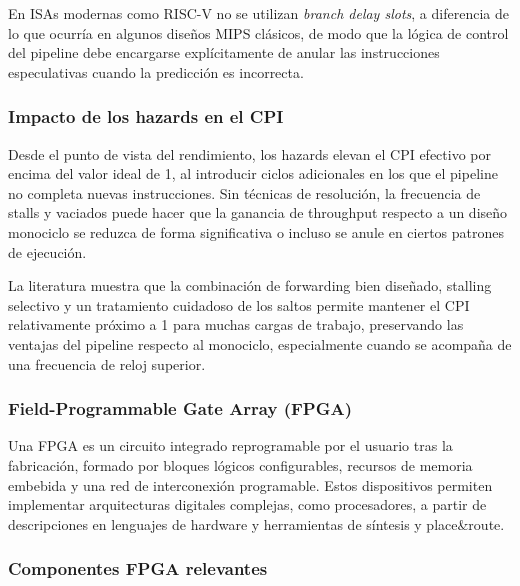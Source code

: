 En ISAs modernas como RISC-V no se utilizan \emph{branch delay slots}, a diferencia de lo que ocurría en algunos diseños MIPS clásicos, de modo que la lógica de control del pipeline debe encargarse explícitamente de anular las instrucciones especulativas cuando la predicción es incorrecta.\parencite{RISCV2019Manual}


\subsubsection{Impacto de los hazards en el CPI}


Desde el punto de vista del rendimiento, los hazards elevan el CPI efectivo por encima del valor ideal de 1, al introducir ciclos adicionales en los que el pipeline no completa nuevas instrucciones. Sin técnicas de resolución, la frecuencia de stalls y vaciados puede hacer que la ganancia de throughput respecto a un diseño monociclo se reduzca de forma significativa o incluso se anule en ciertos patrones de ejecución.\parencite{Patterson2017Computer}

La literatura muestra que la combinación de forwarding bien diseñado, stalling selectivo y un tratamiento cuidadoso de los saltos permite mantener el CPI relativamente próximo a 1 para muchas cargas de trabajo, preservando las ventajas del pipeline respecto al monociclo, especialmente cuando se acompaña de una frecuencia de reloj superior.\parencite{Najjar2018Pipeline,Yi2020CPI}


\subsubsection{Field-Programmable Gate Array (FPGA)}

Una FPGA es un circuito integrado reprogramable por el usuario tras la fabricación, formado por bloques lógicos configurables, recursos de memoria embebida y una red de interconexión programable. Estos dispositivos permiten implementar arquitecturas digitales complejas, como procesadores, a partir de descripciones en lenguajes de hardware y herramientas de síntesis y place\&route.\parencite{Chu2011FPGA}


\subsubsection{Componentes FPGA relevantes}

